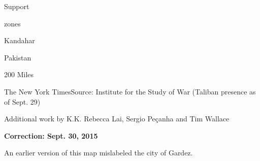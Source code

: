 Support

zones

Kandahar

Pakistan

200 Miles

The New York Times\textbar{}Source: Institute for the Study of War
(Taliban presence as of Sept. 29)

Additional work by K.K. Rebecca Lai, Sergio Peçanha and Tim Wallace

\textbf{Correction: Sept. 30, 2015}

An earlier version of this map mislabeled the city of Gardez.

\subsection{}

